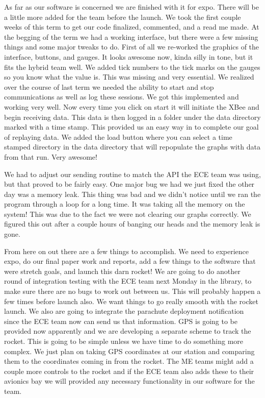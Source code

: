 \documentclass[10pt,draftclsnofoot,onecolumn]{IEEEtran}
\begin{document}
As far as our software is concerned we are finished with it for expo. There will be a little more added for the team before the launch. We took the first couple weeks of this term to get our code finalized, commented, and a read me made. At the begging of the term we had a working interface, but there were a few missing things and some major tweaks to do. First of all we re-worked the graphics of the interface, buttons, and gauges. It looks awesome now, kinda silly in tone, but it fits the hybrid team well. We added tick numbers to the tick marks on the gauges so you know what the value is. This was missing and very essential. We realized over the course of last term we needed the ability to start and stop communications as well as log these sessions. We got this implemented and working very well. Now every time you click on start it will initiate the XBee and begin receiving data. This data is then logged in a folder under the data directory marked with a time stamp. This provided us an easy way in to complete our goal of replaying data. We added the load button where you can select a time stamped directory in the data directory that will repopulate the graphs with data from that run. Very awesome! \par

We had to adjust our sending routine to match the API the ECE team was using, but that proved to be fairly easy. One major bug we had we just fixed the other day was a memory leak. This thing was bad and we didn't notice until we ran the program through a loop for a long time. It was taking all the memory on the system! This was due to the fact we were not clearing our graphs correctly. We figured this out after a couple hours of banging our heads and the memory leak is gone. \par

From here on out there are a few things to accomplish. We need to experience expo, do our final paper work and reports, add a few things to the software that were stretch goals, and launch this darn rocket! We are going to do another round of integration testing with the ECE team next Monday in the library, to make sure there are no bugs to work out between us. This will probably happen a few times before launch also. We want things to go really smooth with the rocket launch. We also are going to integrate the parachute deployment notification since the ECE team now can send us that information. GPS is going to be provided now apparently and we are developing a separate scheme to track the rocket. This is going to be simple unless we have time to do something more complex. We just plan on taking GPS coordinates at our station and comparing them to the coordinates coming in from the rocket. The ME teams might add a couple more controls to the rocket and if the ECE team also adds these to their avionics bay we will provided any necessary functionality in our software for the team. \par
\end{document}
